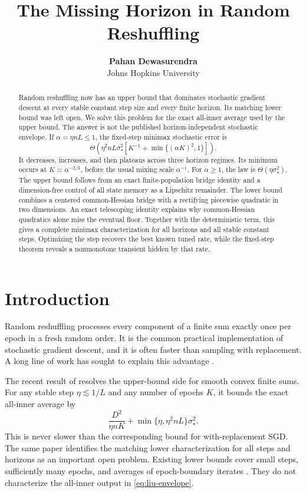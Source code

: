 \documentclass{article}
\title{The Missing Horizon in Random Reshuffling}
\author{\textbf{Pahan Dewasurendra} \\ Johns Hopkins University}
\theoremstyle{remark}
\newcommand{\1}{\mathbf 1}
\newcommand{\SGD}{\textsf{SGD}}
\begin{document}
\maketitle

\begin{abstract}
Random reshuffling now has an upper bound that dominates stochastic gradient descent at every stable constant step size and every finite horizon. Its matching lower bound was left open. We solve this problem for the exact all-inner average used by the upper bound. The answer is not the published horizon-independent stochastic envelope. If $\alpha=\eta nL\leq1$, the fixed-step minimax stochastic error is \[ \Theta\!\left(\eta^2nL\sigma_\star^2 \left[K^{-1}+\min\{(\alpha K)^2,1\}\right]\right). \] It decreases, increases, and then plateaus across three horizon regimes. Its minimum occurs at $K\asymp\alpha^{-2/3}$, before the usual mixing scale $\alpha^{-1}$. For $\alpha\geq1$, the law is $\Theta(\eta\sigma_\star^2)$. The upper bound follows from an exact finite-population bridge identity and a dimension-free control of all state memory as a Lipschitz remainder. The lower bound combines a centered common-Hessian bridge with a rectifying piecewise quadratic in two dimensions. An exact telescoping identity explains why common-Hessian quadratics alone miss the eventual floor. Together with the deterministic term, this gives a complete minimax characterization for all horizons and all stable constant steps. Optimizing the step recovers the best known tuned rate, while the fixed-step theorem reveals a nonmonotone transient hidden by that rate.
\end{abstract}

\section{Introduction}

Random reshuffling processes every component of a finite sum exactly once per epoch in a fresh random order. It is the common practical implementation of stochastic gradient descent, and it is often faster than sampling with replacement. A long line of work has sought to explain this advantage \citep{gurbuzbalaban2021why,nagaraj2019sgd,haochen2019random, mishchenko2020random,nguyen2021unified,safran2020how,safran2021many}.

The recent result of \citet{liu2026dominates} resolves the upper-bound side for smooth convex finite sums. For any stable step $\eta\lesssim1/L$ and any number of epochs $K$, it bounds the exact all-inner average by
\begin{equation}
 \frac{D^2}{\eta nK}
 +\min\{\eta,\eta^2nL\}\sigma_\star^2 .       \label{eq:liu-envelope}
\end{equation}
This is never slower than the corresponding bound for with-replacement \SGD. The same paper identifies the matching lower characterization for all steps and horizons as an important open problem. Existing lower bounds cover small steps, sufficiently many epochs, and averages of epoch-boundary iterates \citep{cha2023tighter}. They do not characterize the all-inner output in \eqref{eq:liu-envelope}.
\end{document}
